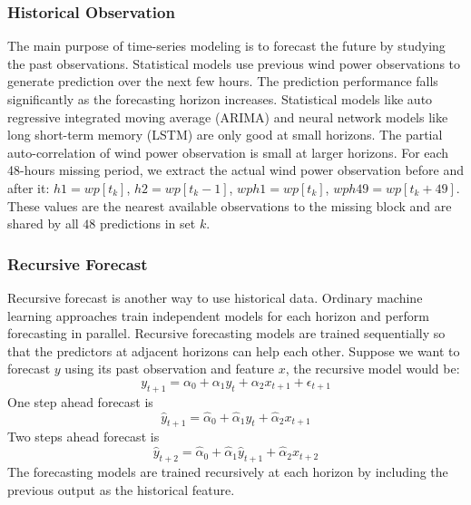 \documentclass[conference]{IEEEtran}
\begin{document}
\subsubsection{Historical Observation}
The main purpose of time-series modeling is to forecast the future by studying the past observations. Statistical models use previous wind power observations to generate prediction over the next few hours. The prediction performance falls significantly as the forecasting horizon increases. Statistical models like auto regressive integrated moving average (ARIMA) and neural network models like long short-term memory (LSTM) are only good at small horizons. The partial auto-correlation of wind power observation is small at larger horizons.
For each 48-hours missing period, we extract the actual wind power observation before and after it: $h1 = wp[t_k]$, $h2 = wp[t_k-1]$, $wph1 = wp[t_k]$, $wph49 = wp[t_k+49]$. These values are the nearest available observations to the missing block and are shared by all $48$ predictions in set $k$. %

\subsubsection{Recursive Forecast}
Recursive forecast is another way to use historical data. Ordinary machine learning approaches train independent models for each horizon and perform forecasting in parallel. Recursive forecasting models are trained sequentially so that the predictors at adjacent horizons can help each other. Suppose we want to forecast $y$ using its past observation and feature $x$, the recursive model would be:
\begin{equation}
    y_{t+1} = \alpha_0 + \alpha_1 y_t + \alpha_2 x_{t+1} + \epsilon_{t+1}
\end{equation}
One step ahead forecast is
\begin{equation}
    \hat{y}_{t+1} = \hat{\alpha}_0 + \hat{\alpha}_1 y_t + \hat{\alpha}_2 x_{t+1}
\end{equation}
Two steps ahead forecast is
\begin{equation}
    \hat{y}_{t+2} = \hat{\alpha}_0 + \hat{\alpha}_1 \hat{y}_{t+1} + \hat{\alpha}_2 x_{t+2}
\end{equation}
The forecasting models are trained recursively at each horizon by including the previous output as the historical feature. %
\end{document}

